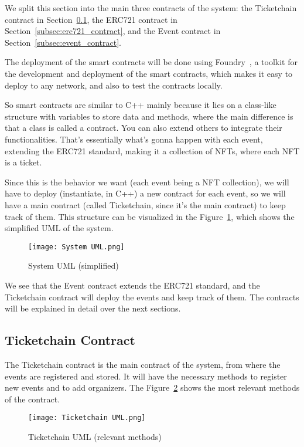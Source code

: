 We split this section into the main three contracts of the system: the
Ticketchain contract in Section~\ref{subsec:ticketchain_contract}, the ERC721
contract in Section~\ref{subsec:erc721_contract}, and the Event contract in
Section~\ref{subsec:event_contract}.

The deployment of the smart contracts will be done using
Foundry~\cite{foundry}, a toolkit for the development and deployment of the
smart contracts, which makes it easy to deploy to any network, and also to test
the contracts locally.

So smart contracts are similar to C++ mainly because it lies on a class-like
structure with variables to store data and methods, where the main difference
is that a class is called a contract. You can also extend others to integrate
their functionalities. That's essentially what's gonna happen with each event,
extending the ERC721 standard, making it a collection of NFTs, where each NFT
is a ticket.

Since this is the behavior we want (each event being a NFT collection), we will
have to deploy (instantiate, in C++) a new contract for each event, so we will
have a main contract (called Ticketchain, since it's the main contract) to keep
track of them. This structure can be visualized in the
Figure~\ref{fig:system_uml}, which shows the simplified UML of the system.

\begin{figure}[H]
	\texttt{[image: System UML.png]}
	\centering
	\caption{System UML (simplified)}\label{fig:system_uml}
\end{figure}

We see that the Event contract extends the ERC721 standard, and the Ticketchain
contract will deploy the events and keep track of them. The contracts will be
explained in detail over the next sections.

\subsection{Ticketchain Contract}\label{subsec:ticketchain_contract}

The Ticketchain contract is the main contract of the system, from where the
events are registered and stored. It will have the necessary methods to
register new events and to add organizers. The Figure~\ref{fig:ticketchain_uml}
shows the most relevant methods of the contract.

\begin{figure}[H]
	\texttt{[image: Ticketchain UML.png]}
	\centering
	\caption{Ticketchain UML (relevant methods)}\label{fig:ticketchain_uml}
\end{figure}

